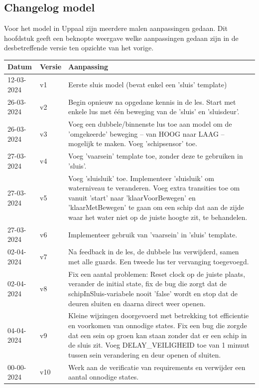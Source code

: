 \documentclass{article} %
\begin{document}
\subsection{Changelog model}
Voor het model in Uppaal zijn meerdere malen aanpassingen gedaan. Dit hoofdstuk geeft een beknopte weergave welke aanpassingen gedaan zijn in de desbetreffende versie ten opzichte van het vorige. \par
\begin{tabular}{|p{}|p{}|p{}|}
    \hline
    Datum & Versie & Aanpassing \\
    \hline
    12-03-2024 & v1 & Eerste sluis model (bevat enkel een 'sluis' template)\\
    \hline
    26-03-2024 & v2 & Begin opnieuw na opgedane kennis in de les. Start met enkele lus met één beweging van de 'sluis' en 'sluisdeur'.\\
    \hline
    26-03-2024 & v3 & Voeg een dubbele/binnenste lus toe aan model om de 'omgekeerde' beweging -- van HOOG naar LAAG -- mogelijk te maken. Voeg 'schipsensor' toe.\\
    \hline
    27-03-2024 & v4 & Voeg 'vaarsein' template toe, zonder deze te gebruiken in 'sluis'.\\
    \hline
    27-03-2024 & v5 & Voeg 'sluisluik' toe. Implementeer 'sluisluik' om waterniveau te veranderen. Voeg extra transities toe om vanuit 'start' naar 'klaarVoorBewegen' en 'klaarMetBewegen' te gaan om een schip dat aan de zijde waar het water niet op de juiste hoogte zit, te behandelen.\\
    \hline
    27-03-2024 & v6 & Implementeer gebruik van 'vaarsein' in 'sluis' template.\\
    \hline
    02-04-2024 & v7 & Na feedback in de les, de dubbele lus verwijderd, samen met alle guards. Een tweede lus ter vervanging toegevoegd.\\
    \hline
    02-04-2024 & v8 & Fix een aantal problemen: Reset clock op de juiste plaats, verander de initial state, fix de bug die zorgt dat de schipInSluis-variabele nooit 'false' wordt en stop dat de deuren sluiten en daarna direct weer openen.\\
    \hline
    04-04-2024 & v9 & Kleine wijzingen  doorgevoerd met betrekking tot efficientie en voorkomen van onnodige states. Fix een bug die zorgde dat een sein op groen kan staan zonder dat er een schip in de sluis zit. Voeg DELAY\_VEILIGHEID toe van 1 minuut tussen sein verandering en deur openen of sluiten.\\
    \hline
    00-00-2024 & v10 & Werk aan de verificatie van requirements en verwijder een aantal onnodige states.\\
    \hline
\end{tabular}
\end{document}
